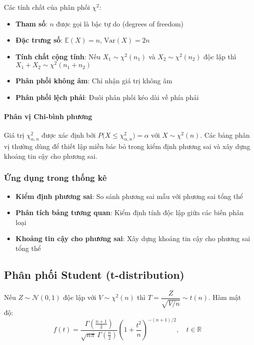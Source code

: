 \begin{tinhchat}
Các tính chất của phân phối $\chi^2$:
\begin{itemize}
    \item \textbf{Tham số}: $n$ được gọi là bậc tự do (degrees of freedom)
    \item \textbf{Đặc trưng số}: $\mathbb{E}(X)=n$, $\text{Var}(X)=2n$
    \item \textbf{Tính chất cộng tính}: Nếu $X_1\sim\chi^2(n_1)$ và $X_2\sim\chi^2(n_2)$ độc lập thì $X_1+X_2\sim\chi^2(n_1+n_2)$
    \item \textbf{Phân phối không âm}: Chỉ nhận giá trị không âm
    \item \textbf{Phân phối lệch phải}: Đuôi phân phối kéo dài về phía phải
\end{itemize}
\end{tinhchat}

\paragraph{Phân vị Chi-bình phương}
Giá trị $\chi^2_{\alpha,n}$ được xác định bởi $P\big(X\le \chi^2_{\alpha,n}\big)=\alpha$ với $X\sim\chi^2(n)$. Các bảng phân vị thường dùng để thiết lập miền bác bỏ trong kiểm định phương sai và xây dựng khoảng tin cậy cho phương sai.

\subsubsection*{Ứng dụng trong thống kê}
\begin{itemize}
    \item \textbf{Kiểm định phương sai}: So sánh phương sai mẫu với phương sai tổng thể
    \item \textbf{Phân tích bảng tương quan}: Kiểm định tính độc lập giữa các biến phân loại
    \item \textbf{Khoảng tin cậy cho phương sai}: Xây dựng khoảng tin cậy cho phương sai tổng thể
\end{itemize}

\subsection{Phân phối Student (t-distribution)}
\begin{dn}
Nếu $Z\sim\mathcal{N}(0,1)$ độc lập với $V\sim\chi^2(n)$ thì $T=\dfrac{Z}{\sqrt{V/n}}\sim t(n)$. Hàm mật độ:
\[
f(t)=\frac{\Gamma\left(\frac{n+1}{2}\right)}{\sqrt{n\pi}\,\Gamma\left(\frac{n}{2}\right)}\left(1+\frac{t^2}{n}\right)^{-(n+1)/2}, \quad t\in\mathbb{R}
\]
\end{dn}

